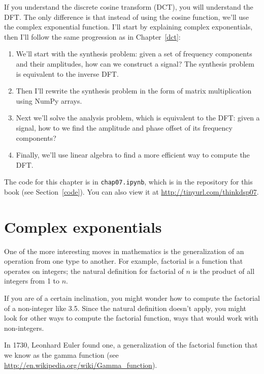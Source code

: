 \documentclass[12pt]{book}
\begin{document}
If you understand the discrete cosine transform (DCT), you will
understand the DFT.  The only difference is that instead of using the
cosine function, we'll use the complex exponential function.  I'll
start by explaining complex exponentials, then I'll follow the
same progression as in Chapter~\ref{dct}:

\begin{enumerate}

\item We'll start with the synthesis
  problem: given a set of frequency components and their amplitudes,
  how can we construct a signal?  The synthesis problem is
  equivalent to the inverse DFT.

\item Then I'll rewrite the synthesis problem in the form of matrix
  multiplication using NumPy arrays.

\item Next we'll solve the analysis problem, which is equivalent to
  the DFT: given a signal, how to we find the amplitude and phase
  offset of its frequency components?

\item Finally, we'll use linear algebra to find a more efficient way
  to compute the DFT.

\end{enumerate}

The code for this chapter is in {\tt chap07.ipynb}, which is in the
repository for this book (see Section~\ref{code}).
You can also view it at \url{http://tinyurl.com/thinkdsp07}.


\section{Complex exponentials}

One of the more interesting moves in mathematics is the generalization
of an operation from one type to another.  For example, factorial is a
function that operates on integers; the natural definition for
factorial of $n$ is the product of all integers from 1 to $n$.

If you are of a certain inclination, you might wonder how to compute
the factorial of a non-integer like 3.5.  Since the natural definition
doesn't apply, you might look for other ways to compute the factorial
function, ways that would work with non-integers.

In 1730, Leonhard Euler found one, a generalization of the factorial
function that we know as the gamma function (see
\url{http://en.wikipedia.org/wiki/Gamma_function}).
\end{document}
